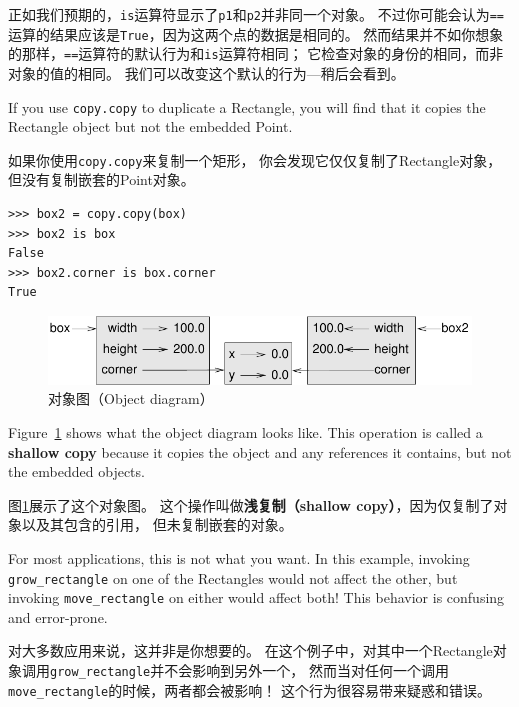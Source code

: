 \documentclass[10pt]{book}
\begin{document}
\begin{CJK}{UTF8}{gbsn}
正如我们预期的，{\tt is}运算符显示了{\tt p1}和{\tt p2}并非同一个对象。
不过你可能会认为{\tt ==}运算的结果应该是{\tt True}，因为这两个点的数据是相同的。
然而结果并不如你想象的那样，{\tt ==}运算符的默认行为和{\tt is}运算符相同；
它检查对象的身份的相同，而非对象的值的相同。
我们可以改变这个默认的行为---稍后会看到。

If you use {\tt copy.copy} to duplicate a Rectangle, you will find
that it copies the Rectangle object but not the embedded Point.

如果你使用{\tt copy.copy}来复制一个矩形，
你会发现它仅仅复制了Rectangle对象，但没有复制嵌套的Point对象。

\begin{verbatim}
>>> box2 = copy.copy(box)
>>> box2 is box
False
>>> box2.corner is box.corner
True
\end{verbatim}

\begin{figure}
\centerline
{\includegraphics[scale=0.8]{figs/rectangle2.pdf}}
\caption{对象图（Object diagram）}
\label{fig.rectangle2}
\end{figure}

Figure~\ref{fig.rectangle2} shows what the object diagram looks like.
This operation is called a {\bf shallow copy} because it copies the
object and any references it contains, but not the embedded objects.

图\ref{fig.rectangle2}展示了这个对象图。
这个操作叫做{\bf 浅复制（shallow copy）}，因为仅复制了对象以及其包含的引用，
但未复制嵌套的对象。

For most applications, this is not what you want.  In this example,
invoking \verb"grow_rectangle" on one of the Rectangles would not
affect the other, but invoking \verb"move_rectangle" on either would
affect both!  This behavior is confusing and error-prone.

对大多数应用来说，这并非是你想要的。
在这个例子中，对其中一个Rectangle对象调用\verb"grow_rectangle"并不会影响到另外一个，
然而当对任何一个调用\verb"move_rectangle"的时候，两者都会被影响！
这个行为很容易带来疑惑和错误。


\end{CJK}
\end{document}
